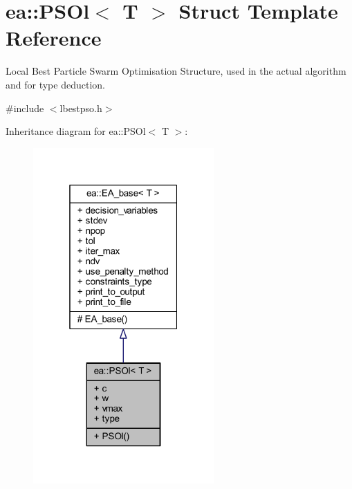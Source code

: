 \hypertarget{structea_1_1_p_s_ol}{}\section{ea\+:\+:P\+S\+Ol$<$ T $>$ Struct Template Reference}
\label{structea_1_1_p_s_ol}


Local Best Particle Swarm Optimisation Structure, used in the actual algorithm and for type deduction.  




{\ttfamily \#include $<$lbestpso.\+h$>$}



Inheritance diagram for ea\+:\+:P\+S\+Ol$<$ T $>$\+:
\nopagebreak
\begin{figure}[H]
\begin{center}
\leavevmode
\includegraphics[width=196pt]{structea_1_1_p_s_ol__inherit__graph}
\end{center}
\end{figure}
